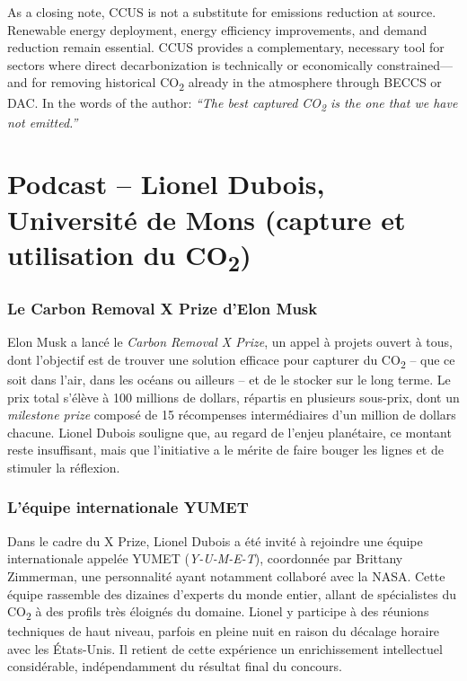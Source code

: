 \medskip

As a closing note, CCUS is not a substitute for emissions reduction at source. 
Renewable energy deployment, energy efficiency improvements, and demand reduction 
remain essential. CCUS provides a complementary, necessary tool for sectors where 
direct decarbonization is technically or economically constrained---and for removing 
historical CO\textsubscript{2} already in the atmosphere through BECCS or DAC. 
In the words of the author: \textit{``The best captured CO\textsubscript{2} is the 
one that we have not emitted.''}

\section{Podcast -- Lionel Dubois, Université de Mons (capture et utilisation du CO\texorpdfstring{\textsubscript{2}}{2})}

\subsubsection{Le Carbon Removal X Prize d'Elon Musk}
Elon Musk a lancé le \textit{Carbon Removal X Prize}, un appel à projets ouvert à tous, dont l'objectif est de trouver une solution efficace pour capturer du CO\textsubscript{2} -- que ce soit dans l'air, dans les océans ou ailleurs -- et de le stocker sur le long terme. Le prix total s'élève à 100 millions de dollars, répartis en plusieurs sous-prix, dont un \textit{milestone prize} composé de 15 récompenses intermédiaires d'un million de dollars chacune. Lionel Dubois souligne que, au regard de l'enjeu planétaire, ce montant reste insuffisant, mais que l'initiative a le mérite de faire bouger les lignes et de stimuler la réflexion.

\subsubsection{L'équipe internationale YUMET}
Dans le cadre du X Prize, Lionel Dubois a été invité à rejoindre une équipe internationale appelée YUMET (\textit{Y-U-M-E-T}), coordonnée par Brittany Zimmerman, une personnalité ayant notamment collaboré avec la NASA. Cette équipe rassemble des dizaines d'experts du monde entier, allant de spécialistes du CO\textsubscript{2} à des profils très éloignés du domaine. Lionel y participe à des réunions techniques de haut niveau, parfois en pleine nuit en raison du décalage horaire avec les États-Unis. Il retient de cette expérience un enrichissement intellectuel considérable, indépendamment du résultat final du concours.

